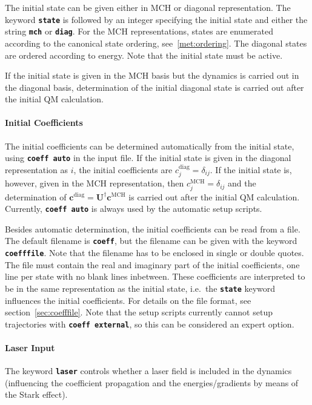 \documentclass[a4paper,10pt,DIV=15,openany]{scrbook}
\newcommand{\ttt}[1]{\textbf{\texttt{#1}}}
\newcommand{\VEC}[1]{\ensuremath{\mathbf{#1}}}
\begin{document}
The initial state can be given either in MCH or diagonal representation. The keyword \ttt{state} is followed by an integer specifying the initial state and either the string \ttt{mch} or \ttt{diag}. For the MCH representations, states are enumerated according to the canonical state ordering, see~\ref{met:ordering}. The diagonal states are ordered according to energy. Note that the initial state must be active. 

If the initial state is given in the MCH basis but the dynamics is carried out in the diagonal basis, determination of the initial diagonal state is carried out after the initial QM calculation.

\paragraph{Initial Coefficients}

The initial coefficients can be determined automatically from the initial state, using \ttt{coeff auto} in the input file. If the initial state is given in the diagonal representation as $i$, the initial coefficients are $c^{\text{diag}}_j=\delta_{ij}$. If the initial state is, however, given in the MCH representation, then $c^{\text{MCH}}_j=\delta_{ij}$ and the determination of $\VEC{c}^{\text{diag}}=\VEC{U}^\dagger\VEC{c}^{\text{MCH}}$ is carried out after the initial QM calculation. 
Currently, \ttt{coeff auto} is always used by the automatic setup scripts.

Besides automatic determination, the initial coefficients can be read from a file. The default filename is \ttt{coeff}, but the filename can be given with the keyword \ttt{coefffile}. Note that the filename has to be enclosed in single or double quotes. The file must contain the real and imaginary part of the initial coefficients, one line per state with no blank lines inbetween. These coefficients are interpreted to be in the same representation as the initial state, i.e.\ the \ttt{state} keyword influences the initial coefficients. For details on the file format, see section~\ref{sec:coefffile}.
Note that the setup scripts currently cannot setup trajectories with \ttt{coeff external}, so this can be considered an expert option.

\paragraph{Laser Input}

The keyword \ttt{laser} controls whether a laser field is included in the dynamics (influencing the coefficient propagation and the energies/gradients by means of the Stark effect). 
\end{document}
